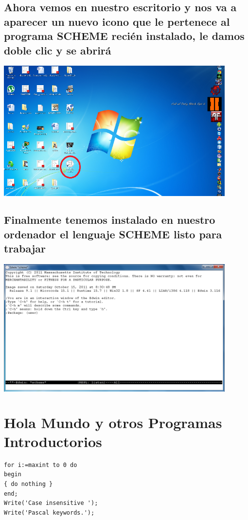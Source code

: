 \documentclass[11pt]{article} %
\begin{document}
\subsection{Ahora vemos en nuestro escritorio y nos va a aparecer un nuevo icono que le pertenece al programa SCHEME recién instalado, le damos doble clic y se abrirá}
\begin{center}
\includegraphics[width=12cm]{7.png}
\end{center}

\subsection{Finalmente tenemos instalado en nuestro ordenador el lenguaje SCHEME listo para trabajar}
\begin{center}
\includegraphics[width=12cm]{8.png}
\end{center}

\section{Hola Mundo y otros Programas Introductorios}

\lstset{language=Pascal}          %

\begin{lstlisting}[frame=single]  % Start your code-block
for i:=maxint to 0 do
begin
{ do nothing }
end;
Write('Case insensitive ');
Write('Pascal keywords.');
\end{lstlisting}
\end{document}
